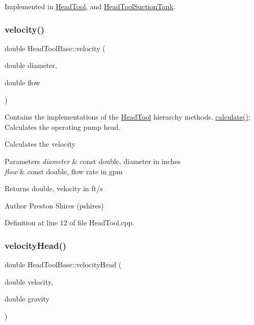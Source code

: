 Implemented in \hyperlink{class_head_tool_ab107e7717df4ca95404ce1952c21a84e}{Head\+Tool}, and \hyperlink{class_head_tool_suction_tank_a390a38466222aa3b87d2cf2ec84537a5}{Head\+Tool\+Suction\+Tank}.

\mbox{\label{class_head_tool_base_a0412306c4adda62e5840342b0d26ac06}} 
\subsubsection{\texorpdfstring{velocity()}{velocity()}}
{\footnotesize\ttfamily double Head\+Tool\+Base\+::velocity (\begin{DoxyParamCaption}\item[{double}]{diameter,  }\item[{double}]{flow }\end{DoxyParamCaption})\hspace{0.3cm}{\ttfamily [protected]}}



Contains the implementations of the \hyperlink{class_head_tool}{Head\+Tool} hierarchy methods. \hyperlink{class_head_tool_base_ab8df8f908827ce45dc5e769ea0e10f0b}{calculate()}\+: Calculates the operating pump head. 

Calculates the velocity


\begin{DoxyParams}{Parameters}
{\em diameter} & const double, diameter in inches \\
\hline
{\em flow} & const double, flow rate in gpm\\
\hline
\end{DoxyParams}
\begin{DoxyReturn}{Returns}
double, velocity in ft/s
\end{DoxyReturn}
\begin{DoxyAuthor}{Author}
Preston Shires (pshires) 
\end{DoxyAuthor}


Definition at line 12 of file Head\+Tool.\+cpp.

\mbox{\label{class_head_tool_base_a461c3d53a92763ca08c9a5bbcbef83c3}} 
\subsubsection{\texorpdfstring{velocity\+Head()}{velocityHead()}}
{\footnotesize\ttfamily double Head\+Tool\+Base\+::velocity\+Head (\begin{DoxyParamCaption}\item[{double}]{velocity,  }\item[{double}]{gravity }\end{DoxyParamCaption})\hspace{0.3cm}{\ttfamily [protected]}}

